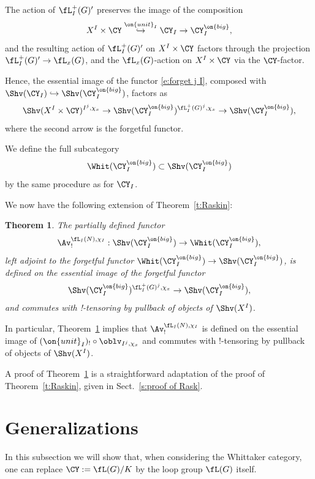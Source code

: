 \documentclass[9pt]{amsart}
\newtheorem{thm}[subsubsection]{Theorem}
\theoremstyle{definition}
\theoremstyle{remark}
\newcommand{\thmref}[1]{Theorem~\ref{#1}}
\newcommand{\secref}[1]{Sect.~\ref{#1}}
\numberwithin{equation}{section}
\begin{document}
The action of $\fL^+_I(G)'$ preserves the image of the composition
$$X^I\times \CY \overset{\on{unit}_I}\hookrightarrow \CY_I \to \CY_I^{\on{big}},$$ 
and the resulting action of $\fL^+_I(G)'$ on $X^I\times \CY$ factors through the projection $\fL^+_I(G)'\to \fL_x(G)$,
and the $\fL_x(G)$-action on $X^I\times \CY$ via the $\CY$-factor. 

\medskip

Hence, the essential image of the functor \eqref{e:forget j I}, composed with $\Shv(\CY_I)\hookrightarrow \Shv(\CY_I^{\on{big}})$, 
factors as 
$$\Shv(X^I\times \CY)^{I^j,\chi_x}\to \Shv(\CY^{\on{big}}_I)^{\fL^+_I(G)^j,\chi_x} \to \Shv(\CY_I^{\on{big}}),$$
where the second arrow is the forgetful functor.

\sssec{}

We define the full subcategory
$$\Whit(\CY_I^{\on{big}}) \subset \Shv(\CY_I^{\on{big}})$$
by the same procedure as for $\CY_I$.

\medskip

We now have the following extension of \thmref{t:Raskin}:

\begin{thm}  \label{t:Raskin I}
The partially defined functor 
$$\Av^{\fL_I(N),\chi_I}_!:\Shv(\CY_I^{\on{big}})\to \Whit(\CY_I^{\on{big}}),$$
left adjoint to the forgetful functor $\Whit(\CY_I^{\on{big}})\to \Shv(\CY_I^{\on{big}})$, 
is defined on the essential image of the forgetful functor 
$$\Shv(\CY^{\on{big}}_I)^{\fL^+_I(G)^j,\chi_x} \to \Shv(\CY_I^{\on{big}}),$$
and commutes with !-tensoring by pullback of objects of $\Shv(X^I)$. 
\end{thm}

In particular, \thmref{t:Raskin I} implies that $\Av^{\fL_I(N),\chi_I}_!$ is defined on the essential image of
$(\on{unit}_I)_!\circ \oblv_{I^j,\chi_x}$ and commutes with !-tensoring by pullback of objects of $\Shv(X^I)$. 

\medskip

A proof of \thmref{t:Raskin I} is a straightforward adaptation of the proof of \thmref{t:Raskin}, given in \secref{s:proof of Rask}.

\section{Generalizations}  \label{s:gen}

  \label{ss:full level}

In this subsection we will show that, when considering the Whittaker category, 
one can replace $\CY:=\fL(G)/K$ by the loop group $\fL(G)$ itself. 
\end{document}
